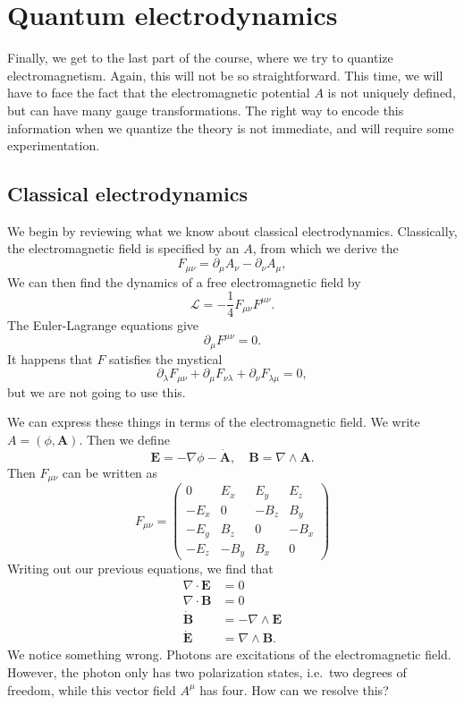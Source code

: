 \documentclass[a4paper]{article}
\begin{document}
\section{Quantum electrodynamics}
Finally, we get to the last part of the course, where we try to quantize electromagnetism. Again, this will not be so straightforward. This time, we will have to face the fact that the electromagnetic potential $A$ is not uniquely defined, but can have many gauge transformations. The right way to encode this information when we quantize the theory is not immediate, and will require some experimentation.

\subsection{Classical electrodynamics}
We begin by reviewing what we know about classical electrodynamics. Classically, the electromagnetic field is specified by an  $A$, from which we derive the 
\[
  F_{\mu\nu} = \partial_\mu A_\nu - \partial_\nu A_\mu,
\]
We can then find the dynamics of a free electromagnetic field by
\[
  \mathcal{L} = -\frac{1}{4} F_{\mu\nu}F^{\mu\nu}.
\]
The Euler-Lagrange equations give
\[
  \partial_\mu F^{\mu\nu} = 0.
\]
It happens that $F$ satisfies the mystical 
\[
  \partial_\lambda F_{\mu\nu} + \partial_\mu F_{\nu\lambda} + \partial_\nu F_{\lambda\mu} = 0,
\]
but we are not going to use this.

We can express these things in terms of the electromagnetic field. We write $A = (\phi, \mathbf{A})$. Then we define
\[
  \mathbf{E} = - \nabla \phi - \dot{\mathbf{A}},\quad \mathbf{B} = \nabla\wedge \mathbf{A}.
\]
Then $F_{\mu\nu}$ can be written as
\[
  F_{\mu\nu} =
  \begin{pmatrix}
    0 & E_x & E_y & E_z\\
    -E_x & 0 & -B_z & B_y\\
    -E_y & B_z & 0 & -B_x\\
    -E_z & -B_y & B_x & 0
  \end{pmatrix}
\]
Writing out our previous equations, we find that
\begin{align*}
  \nabla \cdot \mathbf{E} &= 0\\
  \nabla \cdot \mathbf{B} &= 0\\
  \dot{\mathbf{B}} &= - \nabla \wedge \mathbf{E}\\
  \dot{\mathbf{E}} &= \nabla \wedge \mathbf{B}.
\end{align*}
We notice something wrong. Photons are excitations of the electromagnetic field. However, the photon only has two polarization states, i.e.\ two degrees of freedom, while this vector field $A^\mu$ has four. How can we resolve this?
\end{document}
